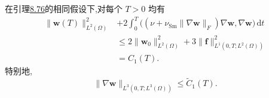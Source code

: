 \begin{lemma}
\label{lem:smagorinsky-l3-stability}
在引理\hyperref[lem:smagorinsky-l2-stability]{8.76}的相同假设下,对每个 $T>0$ 均有
\begin{equation}\label{eq:smagorinsky-energy-estimate}
\begin{aligned}
 \|\bm{w}(T)\|_{L^2(\Omega)}^2
 &+2\int_0^T
  \bigl((\nu+\nu_{\mathrm{Sm}}\|\nabla\bm{w}\|_F)
         \nabla\bm{w},\nabla\bm{w}\bigr)\,\mathrm{d}t\\
 &\le
 2\|\bm{w}_0\|_{L^2(\Omega)}^2
 +3\|\bm{f}\|_{L^1(0,T;L^2(\Omega))}^2\\
 &=C_1(T).
\end{aligned}
\end{equation}
特别地,
\[
 \|\nabla\bm{w}\|_{L^3(0,T;L^3(\Omega))}
 \le \widetilde C_1(T).
\]
\end{lemma}
